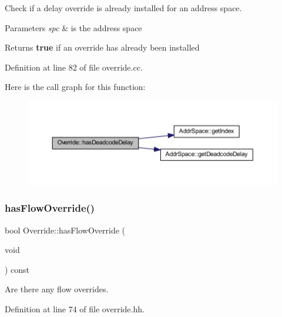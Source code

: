 Check if a delay override is already installed for an address space. 


\begin{DoxyParams}{Parameters}
{\em spc} & is the address space \\
\hline
\end{DoxyParams}
\begin{DoxyReturn}{Returns}
{\bfseries{true}} if an override has already been installed 
\end{DoxyReturn}


Definition at line 82 of file override.\+cc.

Here is the call graph for this function\+:
\nopagebreak
\begin{figure}[H]
\begin{center}
\leavevmode
\includegraphics[width=350pt]{class_override_a3845c19e46f983d2034e06bb1980b672_cgraph}
\end{center}
\end{figure}
\mbox{\label{class_override_aea606077c566aa82541128919c4ba5e2}} 
\subsubsection{\texorpdfstring{hasFlowOverride()}{hasFlowOverride()}}
{\footnotesize\ttfamily bool Override\+::has\+Flow\+Override (\begin{DoxyParamCaption}\item[{void}]{ }\end{DoxyParamCaption}) const\hspace{0.3cm}{\ttfamily [inline]}}



Are there any flow overrides. 



Definition at line 74 of file override.\+hh.

